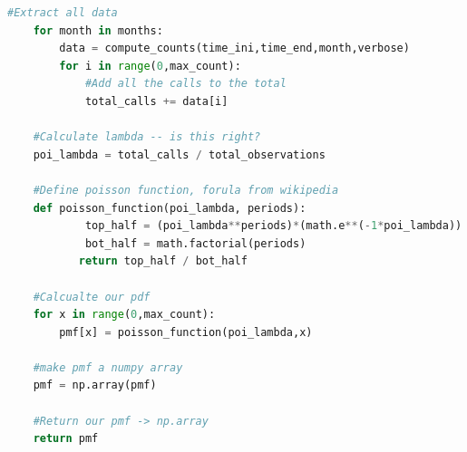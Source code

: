 \documentclass[12pt,twoside]{article}
\begin{document}
\begin{enumerate}
\begin{lstlisting}[language=Python]
    #Extract all data
    for month in months:
        data = compute_counts(time_ini,time_end,month,verbose)
        for i in range(0,max_count):
            #Add all the calls to the total
            total_calls += data[i]
    
    #Calculate lambda -- is this right?
    poi_lambda = total_calls / total_observations
    
    #Define poisson function, forula from wikipedia
    def poisson_function(poi_lambda, periods):
            top_half = (poi_lambda**periods)*(math.e**(-1*poi_lambda))
            bot_half = math.factorial(periods)
           return top_half / bot_half
           
    #Calcualte our pdf
    for x in range(0,max_count):
        pmf[x] = poisson_function(poi_lambda,x)
        
    #make pmf a numpy array
    pmf = np.array(pmf)
    
    #Return our pmf -> np.array
    return pmf
    
\end{lstlisting}



\end{enumerate}
\end{document}
